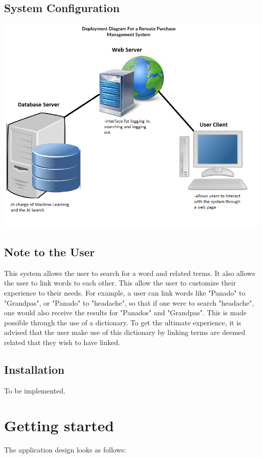 \documentclass[a4paper,10pt]{article}
\begin{document}
\subsection{System Configuration}
	{\centering\includegraphics[width=15cm, scale=0.5]{User Manual Deployment diagram.png}} \\

\subsection{Note to the User}
This system allows the user to search for a word and related terms. It also allows the user to link words to each other. This allow the user to customize their experience to their needs. For example, a user can link words like "Panado" to "Grandpas", or "Panado" to "headache", so that if one were to search "headache", one would also receive the results for "Panados" and "Grandpas". This is made possible through the use of a dictionary. To get the ultimate experience, it is advised that the user make use of this dictionary by linking terms are deemed related that they wish to have linked.

\subsection{Installation}
To be implemented.

\section{Getting started}
	The application design looks as follows: \\
\end{document}
